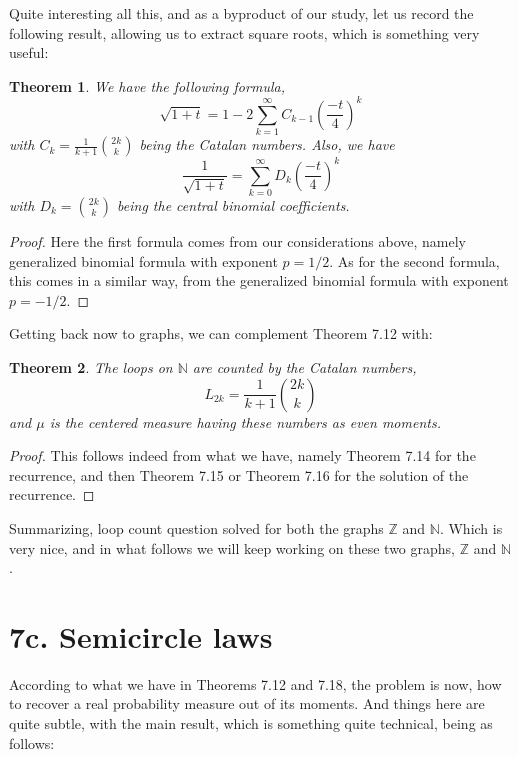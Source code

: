 \documentclass[12pt]{amsbook}
\newtheorem{theorem}{Theorem}[chapter]
\begin{document}
Quite interesting all this, and as a byproduct of our study, let us record the following result, allowing us to extract square roots, which is something very useful:

\begin{theorem}
We have the following formula,
$$\sqrt{1+t}=1-2\sum_{k=1}^\infty C_{k-1}\left(\frac{-t}{4}\right)^k$$
with $C_k=\frac{1}{k+1}\binom{2k}{k}$ being the Catalan numbers. Also, we have
$$\frac{1}{\sqrt{1+t}}=\sum_{k=0}^\infty D_k\left(\frac{-t}{4}\right)^k$$
with $D_k=\binom{2k}{k}$ being the central binomial coefficients.
\end{theorem}

\begin{proof}
Here the first formula comes from our considerations above, namely generalized binomial formula with exponent $p=1/2$. As for the second formula, this comes in a similar way, from the generalized binomial formula with exponent $p=-1/2$.
\end{proof}

Getting back now to graphs, we can complement Theorem 7.12 with:

\begin{theorem}
The loops on $\mathbb N$ are counted by the Catalan numbers,
$$L_{2k}=\frac{1}{k+1}\binom{2k}{k}$$
and $\mu$ is the centered measure having these numbers as even moments.
\end{theorem}

\begin{proof}
This follows indeed from what we have, namely Theorem 7.14 for the recurrence, and then Theorem 7.15 or Theorem 7.16 for the solution of the recurrence.
\end{proof}

Summarizing, loop count question solved for both the graphs $\mathbb Z$ and $\mathbb N$. Which is very nice, and in what follows we will keep working on these two graphs, $\mathbb Z$ and $\mathbb N$.

\section*{7c. Semicircle laws}

According to what we have in Theorems 7.12 and 7.18, the problem is now, how to recover a real probability measure out of its moments. And things here are quite subtle, with the main result, which is something quite technical, being as follows:

\end{document}
